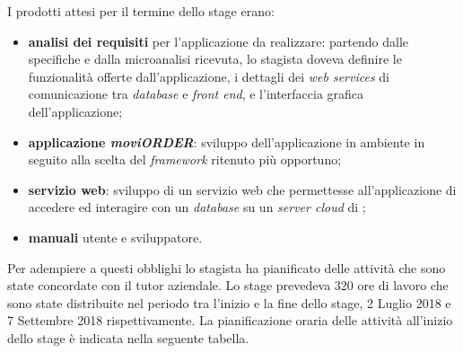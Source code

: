 I prodotti attesi per il termine dello stage erano:
\begin{itemize}
	\item \textbf{analisi dei requisiti} per l'applicazione da realizzare: partendo dalle specifiche e dalla microanalisi ricevuta, lo stagista doveva definire le funzionalità offerte dall'applicazione, i dettagli dei \textit{web services} di comunicazione tra \textit{database} e \textit{front end}, e l'interfaccia grafica dell'applicazione;
	\item \textbf{applicazione \textit{moviORDER}}: sviluppo dell'applicazione in ambiente  in seguito alla scelta del \textit{framework} ritenuto più opportuno;
	\item \textbf{servizio web}: sviluppo di un servizio web che permettesse all'applicazione di accedere ed interagire con un \textit{database} su un \textit{server cloud} di \visione{};
	\item \textbf{manuali} utente e sviluppatore. 
\end{itemize}

Per adempiere a questi obblighi lo stagista ha pianificato delle attività che sono state concordate con il tutor aziendale. Lo stage prevedeva 320 ore di lavoro che sono state distribuite nel periodo tra l'inizio e la fine dello stage, 2 Luglio 2018 e 7 Settembre 2018 rispettivamente. La pianificazione oraria delle attività all'inizio dello stage è indicata nella seguente tabella.

